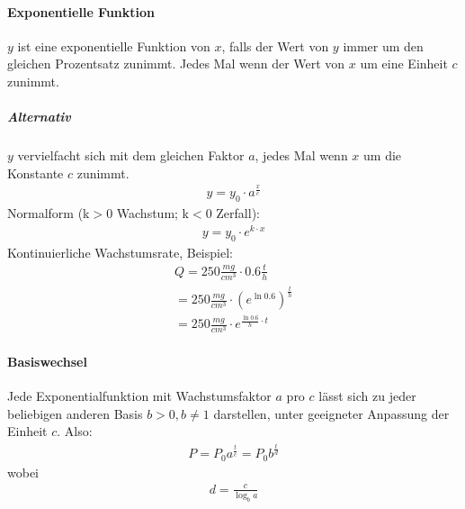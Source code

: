 \documentclass[10pt,a4paper]{article}
\begin{document}
\paragraph{Exponentielle Funktion}$y$ ist eine exponentielle Funktion von $x$, falls der Wert von $y$ immer um den gleichen Prozentsatz zunimmt. Jedes Mal wenn der Wert von $x$ um eine Einheit $c$ zunimmt.
\subparagraph{Alternativ}$y$ vervielfacht sich mit dem gleichen Faktor $a$, jedes Mal wenn $x$ um die Konstante $c$ zunimmt.
\begin{align}
    y = y_0 \cdot a^\frac{x}{c}
\end{align}
Normalform (k$>$0 Wachstum; k$<$0 Zerfall):
\begin{align}
    y = y_0 \cdot e^{k\cdot x}
\end{align}
Kontinuierliche Wachstumsrate, Beispiel:
\begin{align}
    Q=250\frac{mg}{cm^3}\cdot 0.6\frac{t}{h}\\
    =250\frac{mg}{cm^3}\cdot(e^{\ln{0.6}})^{\frac{t}{h}}\\
    =250\frac{mg}{cm^3}\cdot e^{\frac{\ln{0.6}}{h}\cdot t}
\end{align}

\paragraph{Basiswechsel}Jede Exponentialfunktion mit Wachstumsfaktor $a$ pro $c$ lässt sich zu jeder beliebigen anderen Basis $b>0,b\neq 1$ darstellen, unter geeigneter Anpassung der Einheit $c$. Also:
\begin{align}
    P=P_0a^{\frac{t}{c}}=P_0b^{\frac{t}{d}}
\end{align}
wobei
\begin{align}
    d=\frac{c}{\log_{b}a}
\end{align}
\end{document}
